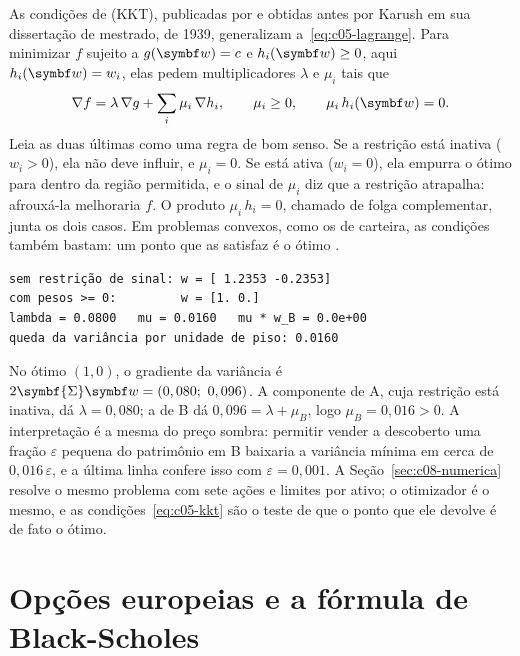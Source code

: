 As condições de  (KKT), publicadas por \citet{kuhn1951} e obtidas antes por Karush em sua dissertação de mestrado, de 1939, generalizam a~\eqref{eq:c05-lagrange}. Para minimizar $f$ sujeito a $g(\vetor{w}) = c$ e $h_i(\vetor{w}) \ge 0$, aqui $h_i(\vetor{w}) = w_i$, elas pedem multiplicadores $\lambda$ e $\mu_i$ tais que
\begin{equation}
  \nabla f = \lambda\,\nabla g + \sum_i \mu_i\,\nabla h_i , \qquad \mu_i \ge 0 , \qquad \mu_i\,h_i(\vetor{w}) = 0 .
  \label{eq:c05-kkt}
\end{equation}
Leia as duas últimas como uma regra de bom senso. Se a restrição está inativa ($w_i > 0$), ela não deve influir, e $\mu_i = 0$. Se está ativa ($w_i = 0$), ela empurra o ótimo para dentro da região permitida, e o sinal de $\mu_i$ diz que a restrição atrapalha: afrouxá-la melhoraria $f$. O produto $\mu_i\,h_i = 0$, chamado de folga complementar, junta os dois casos. Em problemas convexos, como os de carteira, as condições também bastam: um ponto que as satisfaz é o ótimo \citep{boyd2004}.


\begin{lstlisting}[style=saida]
sem restrição de sinal: w = [ 1.2353 -0.2353]
com pesos >= 0:         w = [1. 0.]
lambda = 0.0800   mu = 0.0160   mu * w_B = 0.0e+00
queda da variância por unidade de piso: 0.0160
\end{lstlisting}

No ótimo $(1, 0)$, o gradiente da variância é $2\symbf{\Sigma}\vetor{w} = (0,080;\ 0,096)$. A componente de A, cuja restrição está inativa, dá $\lambda = 0,080$; a de B dá $0,096 = \lambda + \mu_B$, logo $\mu_B = 0,016 > 0$. A interpretação é a mesma do preço sombra: permitir vender a descoberto uma fração $\varepsilon$ pequena do patrimônio em B baixaria a variância mínima em cerca de $0,016\,\varepsilon$, e a última linha confere isso com $\varepsilon = 0,001$. A Seção~\ref{sec:c08-numerica} resolve o mesmo problema com sete ações e limites por ativo; o otimizador é o mesmo, e as condições~\eqref{eq:c05-kkt} são o teste de que o ponto que ele devolve é de fato o ótimo.

\section{Opções europeias e a fórmula de Black-Scholes}
\label{sec:c05-opcoes}

